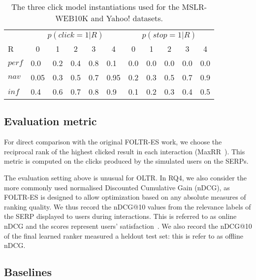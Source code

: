 \newcommand{\tc}[1]{\multicolumn{1}{c}{#1}}
\setlength{\tabcolsep}{3mm}

\begin{table}[t!]
	\centering
	\caption[centre]{The three click model instantiations used for the MSLR-WEB10K and Yahoo! datasets.}\label{mslr-CCM}
	\begin{tabularx}{\textwidth}{XXXXXXXXXXX}
		\toprule
		& \multicolumn{5}{c}{$p(click=1|R)$} & \multicolumn{5}{c}{$p(stop=1|R)$} \\
		\cmidrule(r){2-6}  \cmidrule(){7-11}
		R & \tc{0}& \tc{1} &\tc{2} & \tc{3}& \tc{4}&  \tc{0} & \tc{1} & \tc{2} & \tc{3} & \tc{4} \\
		\midrule
		$perf$ & 0.0 & 0.2 & 0.4 & 0.8 & 0.1& 0.0 & 0.0 & 0.0 & 0.0 & 0.0\\
		$nav$ & 0.05 & 0.3 & 0.5 & 0.7 & 0.95& 0.2 & 0.3 & 0.5 & 0.7 & 0.9\\
		$inf$ & 0.4 & 0.6 & 0.7 & 0.8 & 0.9& 0.1 & 0.2 & 0.3 & 0.4 & 0.5\\
		\bottomrule
	\end{tabularx}
	\vspace{-10pt}
\end{table}

\subsection{Evaluation metric}
For direct comparison with the original FOLTR-ES work, we choose the reciprocal rank of the highest clicked result in each interaction (MaxRR~\cite{radlinski2008learning}). This metric is computed on the clicks produced by the simulated users on the SERPs. 

The evaluation setting above is unusual for OLTR. In RQ4, we also consider the more commonly used normalised Discounted Cumulative Gain (nDCG), as FOLTR-ES is designed to allow optimization based on any absolute measures of ranking quality. We thus record the nDCG@10 values from the relevance labels of the SERP displayed to users during interactions. This is referred to as online nDCG and the scores represent users' satisfaction~\cite{DBLP:conf/wsdm/HofmannSWR13}. We also record the nDCG@10 of the final learned ranker measured a heldout test set: this is refer to as offline nDCG.


\subsection{Baselines}


